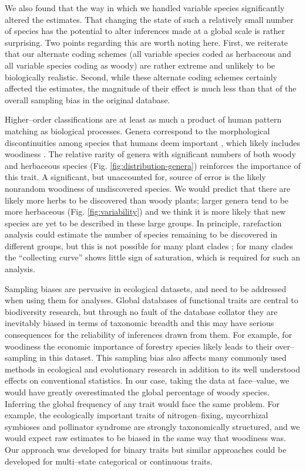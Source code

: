 \documentclass[a4paper,12pt]{article}
\begin{document}
We also found that the way in which we handled variable species
significantly altered the estimates. That changing the state of such a
relatively small number of species has the potential to alter
inferences made at a global scale is rather surprising. Two points
regarding this are worth noting here. First, we reiterate that our
alternate coding schemes (all variable species coded as herbaceous and
all variable species coding as woody) are rather extreme and unlikely
to be biologically realistic. Second, while these alternate coding
schemes certainly affected the estimates, the magnitude of their
effect is much less than that of the overall sampling bias in the
original database.

Higher--order classifications are at least as much a product of human
pattern matching as biological processes.  Genera correspond to the
morphological discontinuities among species that humans deem important
\citep{scotland2004significance}, which likely includes woodiness
\citep[e.g.,][]{Hutchinson}.  The relative rarity of genera with
significant numbers of both woody and herbaceous species (Fig.
\ref{fig:distribution-genera}) reinforces the importance of this
trait.  A significant, but unaccounted for, source of error is the
likely nonrandom woodiness of undiscovered species. We would predict
that there are likely more herbs to be discovered than woody plants;
larger genera tend to be more herbaceous (Fig. \ref{fig:variability}) and we
think it is more likely that new species are yet to be described in
these large groups.  In principle, rarefaction analysis could estimate
the number of species remaining to be discovered in different groups,
but this is not possible for many plant clades \citep{costello2011};
for many clades the ``collecting curve'' shows little sign of
saturation, which is required for such an analysis.

Sampling biases are pervasive in ecological datasets, and need to be
addressed when using them for analyses.  Global databases of
functional traits \citep[e.g., TRY;][]{kattge2011try} are central to
biodiversity research, but through no fault of the database collator
they are inevitably biased in terms of taxonomic breadth and this may
have serious consequences for the reliability of inferences drawn from
them.  For example, for woodiness the economic importance of forestry
species likely leads to their over--sampling in this dataset.
This sampling bias also affects many commonly used methods in
ecological and evolutionary research
\citep[e.g.,][]{ackerly2000taxon,nakagawa2008missing,pennell2013integrative,Pakeman2013}
in addition to its well understood effects on conventional statistics.
In our case, taking the data at face--value, we would have greatly
overestimated the global percentage of woody species.  Inferring the
global frequency of any trait would face the same problem.  For
example, the ecologically important traits of nitrogen--fixing,
mycorrhizal symbioses and pollinator syndrome are strongly
taxonomically structured, and we would expect raw estimates to be
biased in the same way that woodiness was.  Our approach was developed
for binary traits but similar approaches could be developed for
multi--state categorical or continuous traits.
\end{document}
